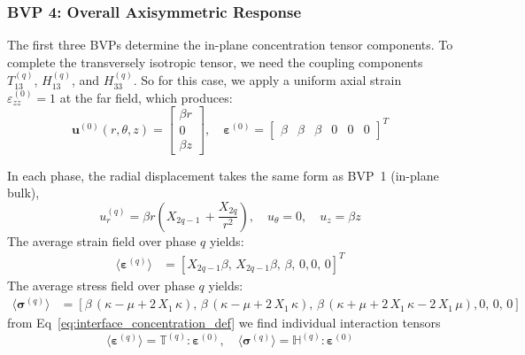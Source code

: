 \documentclass[oneside, 12pt, a4paper, bibliography=totoc]{book}
\newcommand{\bs}[1]{\bm{#1}}                       %
\begin{document}
\subsubsection{BVP 4: Overall Axisymmetric Response}

The first three BVPs determine the in-plane concentration tensor components. To complete the transversely isotropic tensor, we need the coupling components $T_{13}^{(q)}$, $H_{13}^{(q)}$, and $H_{33}^{(q)}$. So for this case, we apply a uniform axial strain $\varepsilon_{zz}^{(0)} = 1$ at the far field, which produces:
%
\begin{equation}
    \bs{u}^{(0)}(r, \theta, z) =
    \begin{bmatrix}
        \beta r \\ 0 \\ \beta z
    \end{bmatrix}, \quad
    \bs{\varepsilon}^{(0)} =
    \begin{bmatrix}
        \beta & \beta & \beta & 0 & 0 & 0
    \end{bmatrix}^T
    \label{eq:bvp4_farfield}
\end{equation}

In each phase, the radial displacement takes the same form as BVP~1 (in-plane bulk),
%
\begin{equation}
    u_r^{(q)} = \beta r (X_{2q-1} \,  + \frac{X_{2q}}{r^2}), \quad u_{\theta} = 0 , \quad u_z = \beta z
    \label{eq:bvp4_displacement}
\end{equation}
%
The average strain field over phase $q$ yields:
%
\begin{align}
\langle \bs{\varepsilon}^{(q)} \rangle
&= [X_{2q-1}\beta,\, X_{2q-1}\beta, \, \beta, \, 0, 0, \, 0]^T
    \label{eq:avg_strain_bulk_fiber}
\end{align}
The average stress field over phase $q$ yields:
\begin{align}
\langle \bs{\sigma}^{(q)} \rangle
&= [\beta \,{\left(\kappa -\mu +2\,X_1 \,\kappa \right)},\,\beta \,{\left(\kappa -\mu +2\,X_1 \,\kappa \right)},\,\beta \,{\left(\kappa +\mu +2\,X_1 \,\kappa -2\,X_1 \,\mu \right)},0,\,0,\,0]
\end{align}
from Eq~\ref{eq:interface_concentration_def} we find individual interaction tensors 
\begin{equation}
    \langle \bs{\varepsilon}^{(q)} \rangle = \mathbb{T}^{(q)} : \bs{\varepsilon}^{(0)}, \quad
    \langle \bs{\sigma}^{(q)} \rangle = \mathbb{H}^{(q)} : \bs{\varepsilon}^{(0)}
\end{equation}
\end{document}
